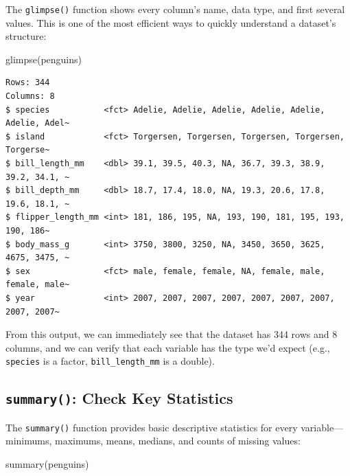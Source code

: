 \documentclass[
  letterpaper,
  DIV=11,
  numbers=noendperiod]{scrreprt}
\newenvironment{Shaded}{\begin{snugshade}}{\end{snugshade}}
\newcommand{\FunctionTok}[1]{\textcolor[rgb]{0.28,0.35,0.67}{#1}}
\newcommand{\NormalTok}[1]{\textcolor[rgb]{0.00,0.23,0.31}{#1}}
\begin{document}
The \texttt{glimpse()} function shows every column's name, data type,
and first several values. This is one of the most efficient ways to
quickly understand a dataset's structure:

\begin{Shaded}
\begin{Highlighting}[]
\FunctionTok{glimpse}\NormalTok{(penguins)}
\end{Highlighting}
\end{Shaded}

\begin{verbatim}
Rows: 344
Columns: 8
$ species           <fct> Adelie, Adelie, Adelie, Adelie, Adelie, Adelie, Adel~
$ island            <fct> Torgersen, Torgersen, Torgersen, Torgersen, Torgerse~
$ bill_length_mm    <dbl> 39.1, 39.5, 40.3, NA, 36.7, 39.3, 38.9, 39.2, 34.1, ~
$ bill_depth_mm     <dbl> 18.7, 17.4, 18.0, NA, 19.3, 20.6, 17.8, 19.6, 18.1, ~
$ flipper_length_mm <int> 181, 186, 195, NA, 193, 190, 181, 195, 193, 190, 186~
$ body_mass_g       <int> 3750, 3800, 3250, NA, 3450, 3650, 3625, 4675, 3475, ~
$ sex               <fct> male, female, female, NA, female, male, female, male~
$ year              <int> 2007, 2007, 2007, 2007, 2007, 2007, 2007, 2007, 2007~
\end{verbatim}

From this output, we can immediately see that the dataset has 344 rows
and 8 columns, and we can verify that each variable has the type we'd
expect (e.g., \texttt{species} is a factor, \texttt{bill\_length\_mm} is
a double).

\subsection{\texorpdfstring{\texttt{summary()}: Check Key
Statistics}{summary(): Check Key Statistics}}\label{summary-check-key-statistics}

The \texttt{summary()} function provides basic descriptive statistics
for every variable---minimums, maximums, means, medians, and counts of
missing values:

\begin{Shaded}
\begin{Highlighting}[]
\FunctionTok{summary}\NormalTok{(penguins)}
\end{Highlighting}
\end{Shaded}
\end{document}
